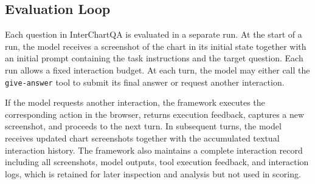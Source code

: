 \documentclass[review,journal,hideappendix]{vgtc} %
\newcommand{\dataset}{InterChartQA}
\begin{document}
\subsection{Evaluation Loop}

Each question in \dataset{} is evaluated in a separate run. At the start of a run, the model receives a screenshot of the chart in its initial state together with an initial prompt containing the task instructions and the target question. Each run allows a fixed interaction budget. At each turn, the model may either call the \texttt{give-answer} tool to submit its final answer or request another interaction.

If the model requests another interaction, the framework executes the corresponding action in the browser, returns execution feedback, captures a new screenshot, and proceeds to the next turn. In subsequent turns, the model receives updated chart screenshots together with the accumulated textual interaction history. The framework also maintains a complete interaction record including all screenshots, model outputs, tool execution feedback, and interaction logs, which is retained for later inspection and analysis but not used in scoring.
\end{document}
